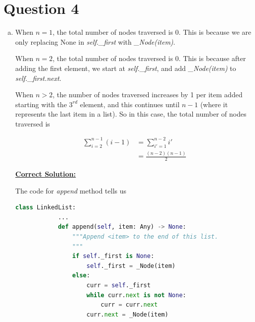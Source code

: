 \documentclass[12pt]{article}
\begin{document}
\section*{Question 4}
\begin{enumerate}[a.]
    \item

    When $n = 1$, the total number of nodes traversed is 0. This is because
    we are only replacing None in \textit{self.\_first} with \textit{\_Node(item)}.

    \bigskip

    When $n = 2$, the total number of nodes traversed is 0. This is because after
    adding the first element, we start at \textit{self.\_first}, and add \textit{\_Node(item)}
    to \textit{self.\_first.next}.

    \bigskip

    When $n > 2$, the number of nodes traversed increases by 1 per item added starting
    with the $3^{rd}$ element, and this continues until $n - 1$ (where it
    represents the last item in a list). So in this case, the total number of nodes
    traversed is

    \begin{align}
        \sum\limits_{i=2}^{n-1} (i-1) &= \sum\limits_{i'= 1}^{n-2} i'\\
        &= \frac{(n-2)(n-1)}{2}
    \end{align}

    \bigskip

    \begin{mdframed}

        \bigskip

        \underline{\textbf{Correct Solution:}}

        \bigskip

        \color{red}The code for \textit{append} method tells us\color{black}

        \begin{lstlisting}[language=python,caption={linked\_list.py}]
        class LinkedList:
            ...
            def append(self, item: Any) -> None:
                """Append <item> to the end of this list.
                """
                if self._first is None:
                    self._first = _Node(item)
                else:
                    curr = self._first
                    while curr.next is not None:
                        curr = curr.next
                    curr.next = _Node(item)
        \end{lstlisting}


\end{mdframed}
\end{enumerate}
\end{document}
